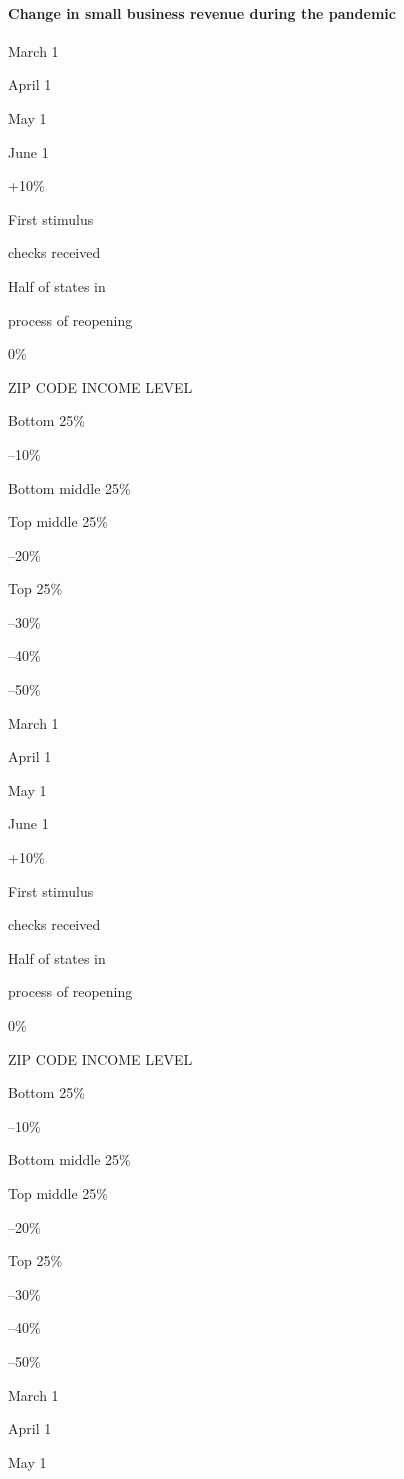 \hypertarget{change-in-small-business-revenue-during-the-pandemic}{%
\paragraph{Change in small business revenue during the
pandemic}\label{change-in-small-business-revenue-during-the-pandemic}}

March 1

April 1

May 1

June 1

+10\%

First stimulus

checks received

Half of states in

process of reopening

0\%

ZIP CODE INCOME LEVEL

Bottom 25\%

--10\%

Bottom middle 25\%

Top middle 25\%

--20\%

Top 25\%

--30\%

--40\%

--50\%

March 1

April 1

May 1

June 1

+10\%

First stimulus

checks received

Half of states in

process of reopening

0\%

ZIP CODE INCOME LEVEL

Bottom 25\%

--10\%

Bottom middle 25\%

Top middle 25\%

--20\%

Top 25\%

--30\%

--40\%

--50\%

March 1

April 1

May 1

